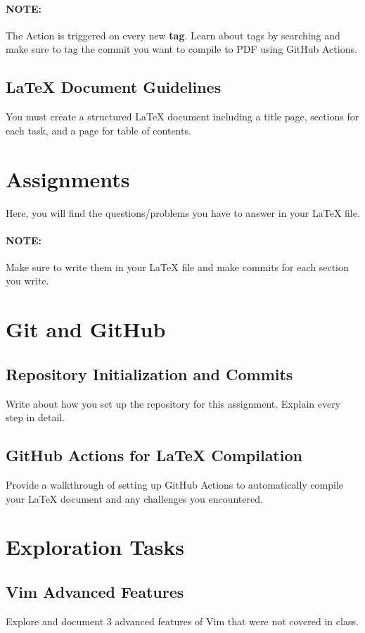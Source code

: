 \documentclass[12pt]{article}
\begin{document}
\paragraph{NOTE:} The Action is triggered on every new \textbf{tag}. Learn about tags by searching and make sure to tag the commit you want to compile to PDF using
GitHub Actions.

\subsection*{LaTeX Document Guidelines}
You must create a structured LaTeX document including a title page, sections for each task, and a page for table of contents.


\pagebreak


\section*{Assignments}
Here, you will find the questions/problems you have to answer in your LaTeX file.
\paragraph{NOTE:} Make sure to write them in your LaTeX file and make commits for each section you write.

\section{Git and GitHub}
\subsection{Repository Initialization and Commits}
Write about how you set up the repository for this assignment. Explain every step in detail.

\subsection{GitHub Actions for LaTeX Compilation}
Provide a walkthrough of setting up GitHub Actions to automatically compile your LaTeX document and any challenges you encountered.


\section{Exploration Tasks}
\subsection{Vim Advanced Features}
Explore and document 3 advanced features of Vim that were not covered in class.
\end{document}
